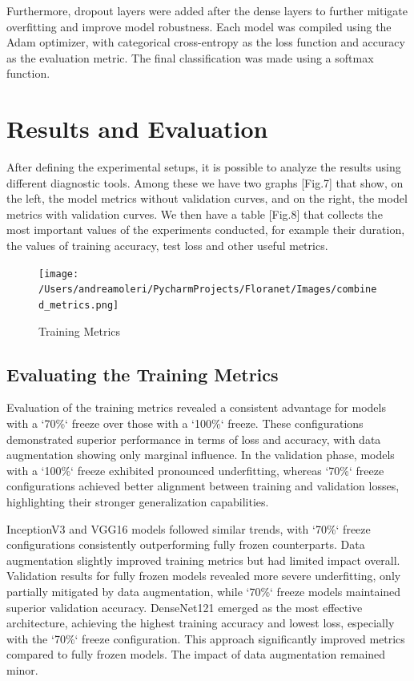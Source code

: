 Furthermore, dropout layers were added after the dense layers to further mitigate overfitting and improve model
robustness. Each model was compiled using the Adam optimizer, with categorical cross-entropy as the loss function and
accuracy as the evaluation metric. The final classification was made using a softmax function.


\section{Results and Evaluation}

After defining the experimental setups, it is possible to analyze the results using different diagnostic tools.
Among these we have two graphs [Fig.7] that show, on the left, the model metrics without validation curves, and on
the right, the model metrics with validation curves. We then have a table [Fig.8] that collects the most important values
of the experiments conducted, for example their duration, the values of training accuracy, test loss and other useful metrics.

\begin{figure}[h!]
    \centering
    \texttt{[image: /Users/andreamoleri/PycharmProjects/Floranet/Images/combined\_metrics.png]}
    \caption{Training Metrics}
\end{figure}

\subsection{Evaluating the Training Metrics}

Evaluation of the training metrics revealed a consistent advantage for models with a `70\%` freeze over those with a
`100\%` freeze. These configurations demonstrated superior performance in terms of loss and accuracy, with data
augmentation showing only marginal influence. In the validation phase, models with a `100\%` freeze exhibited pronounced
underfitting, whereas `70\%` freeze configurations achieved better alignment between training and validation losses,
highlighting their stronger generalization capabilities.

\vspace{0.3cm}

InceptionV3 and VGG16 models followed similar trends, with `70\%` freeze configurations consistently outperforming
fully frozen counterparts. Data augmentation slightly improved training metrics but had limited impact overall.
Validation results for fully frozen models revealed more severe underfitting, only partially mitigated by data
augmentation, while `70\%` freeze models maintained superior validation accuracy.
DenseNet121 emerged as the most effective architecture, achieving the highest training accuracy and lowest loss,
especially with the `70\%` freeze configuration. This approach significantly improved metrics compared to fully frozen
models. The impact of data augmentation remained minor.

